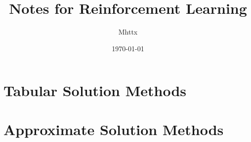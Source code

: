 \documentclass[a4paper]{book}
\title{Notes for Reinforcement Learning} %
\author{Mhttx} %
\date{\today} %
\begin{document}
 
\maketitle %
\tableofcontents


\part{Tabular Solution Methods}




\part{Approximate Solution Methods}







\end{document}
